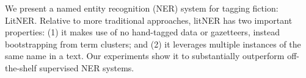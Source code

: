 We present a named entity recognition (NER) system for tagging fiction: LitNER. Relative to more traditional approaches, litNER has two important properties: (1) it makes use of no hand-tagged data or gazetteers, instead bootstrapping from term clusters; and (2) it leverages multiple instances of the same name in a text. Our experiments show it to substantially outperform off-the-shelf supervised NER systems.
